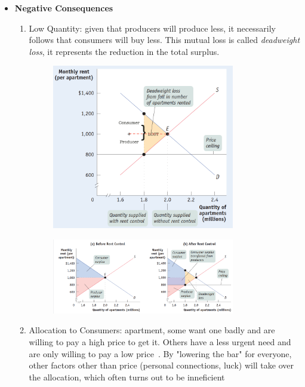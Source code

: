 \documentclass[english,course]{Notes}
\newcommand{\ita}[1]{\textit{#1}}
\begin{document}
\begin{itemize}
	\item \textbf{Negative Consequences}
	\begin{enumerate}
		\item Low Quantity: given that producers will produce less, it necessarily follows that consumers will buy less. This mutual loss is called \ita{deadweight loss}, it represents the reduction in the total surplus.
		
		
		\begin{figure}[h]
\centering
\includegraphics[height=0.4\textwidth,width=0.8\textwidth]{deadweight}
\end{figure}
\begin{figure}[h]
\centering
\includegraphics[height=0.4\textwidth,width=0.8\textwidth]{deadweight2}
\end{figure}
	
	\item Allocation to Consumers: apartment, some want one badly and are willing to pay a high price to get it. Others have a less urgent need and are only willing to pay a low price~. By "lowering the bar" for everyone, other factors other than price (personal connections, luck) will take over the allocation, which often turns out to be inneficient
		

\end{enumerate}
\end{itemize}
\end{document}
